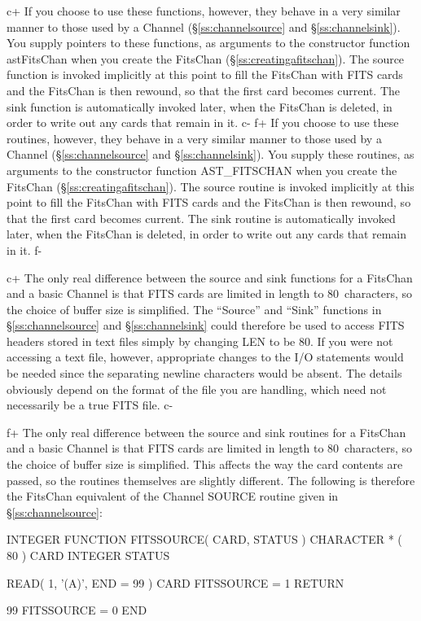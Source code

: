 \documentclass[twoside,11pt]{starlink}
\providecommand{\secref}[1]{\S\ref{#1}}
\begin{document}
c+
If you choose to use these functions, however, they behave in a very
similar manner to those used by a Channel (\secref{ss:channelsource}
and \secref{ss:channelsink}). You supply pointers to these functions,
as arguments to the constructor function astFitsChan when you create
the FitsChan (\secref{ss:creatingafitschan}). The source function is
invoked implicitly at this point to fill the FitsChan with FITS cards
and the FitsChan is then rewound, so that the first card becomes
current. The sink function is automatically invoked later, when the
FitsChan is deleted, in order to write out any cards that remain in
it.
c-
f+
If you choose to use these routines, however, they behave in a very
similar manner to those used by a Channel (\secref{ss:channelsource}
and \secref{ss:channelsink}). You supply these routines, as arguments
to the constructor function AST\_FITSCHAN when you create the FitsChan
(\secref{ss:creatingafitschan}). The source routine is invoked
implicitly at this point to fill the FitsChan with FITS cards and the
FitsChan is then rewound, so that the first card becomes current. The
sink routine is automatically invoked later, when the FitsChan is
deleted, in order to write out any cards that remain in it.
f-

c+
The only real difference between the source and sink functions for a
FitsChan and a basic Channel is that FITS cards are limited in length
to 80~characters, so the choice of buffer size is simplified.  The
``Source'' and ``Sink'' functions in \secref{ss:channelsource} and
\secref{ss:channelsink} could therefore be used to access FITS headers
stored in text files simply by changing LEN to be 80.  If you were not
accessing a text file, however, appropriate changes to the I/O
statements would be needed since the separating newline characters
would be absent. The details obviously depend on the format of the
file you are handling, which need not necessarily be a true FITS file.
c-

f+
The only real difference between the source and sink routines for a
FitsChan and a basic Channel is that FITS cards are limited in length
to 80~characters, so the choice of buffer size is simplified.  This
affects the way the card contents are passed, so the routines
themselves are slightly different.  The following is therefore the
FitsChan equivalent of the Channel SOURCE routine given in
\secref{ss:channelsource}:

\small
\begin{terminalv}
      INTEGER FUNCTION FITSSOURCE( CARD, STATUS )
      CHARACTER * ( 80 ) CARD
      INTEGER STATUS

      READ( 1, '(A)', END = 99 ) CARD
      FITSSOURCE = 1
      RETURN

 99   FITSSOURCE = 0
      END
\end{terminalv}
\normalsize
\end{document}
